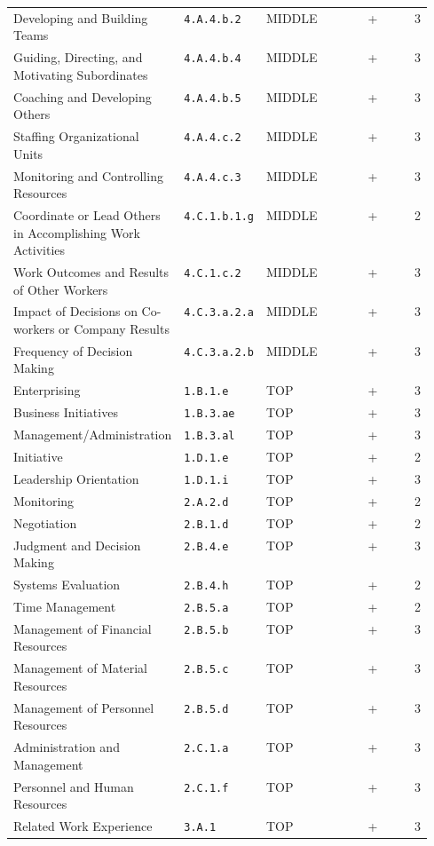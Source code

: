 \begin{longtable}[]{@{}p{0.40\linewidth}p{0.15\linewidth}llr@{}}
Developing and Building Teams & \texttt{4.A.4.b.2} & MIDDLE & + & 3 \\
Guiding, Directing, and Motivating Subordinates & \texttt{4.A.4.b.4} & MIDDLE & + & 3 \\
Coaching and Developing Others & \texttt{4.A.4.b.5} & MIDDLE & + & 3 \\
Staffing Organizational Units & \texttt{4.A.4.c.2} & MIDDLE & + & 3 \\
Monitoring and Controlling Resources & \texttt{4.A.4.c.3} & MIDDLE & + & 3 \\
Coordinate or Lead Others in Accomplishing Work Activities & \texttt{4.C.1.b.1.g} & MIDDLE & + & 2 \\
Work Outcomes and Results of Other Workers & \texttt{4.C.1.c.2} & MIDDLE & + & 3 \\
Impact of Decisions on Co-workers or Company Results & \texttt{4.C.3.a.2.a} & MIDDLE & + & 3 \\
Frequency of Decision Making & \texttt{4.C.3.a.2.b} & MIDDLE & + & 3 \\
Enterprising & \texttt{1.B.1.e} & TOP & + & 3 \\
Business Initiatives & \texttt{1.B.3.ae} & TOP & + & 3 \\
Management/Administration & \texttt{1.B.3.al} & TOP & + & 3 \\
Initiative & \texttt{1.D.1.e} & TOP & + & 2 \\
Leadership Orientation & \texttt{1.D.1.i} & TOP & + & 3 \\
Monitoring & \texttt{2.A.2.d} & TOP & + & 2 \\
Negotiation & \texttt{2.B.1.d} & TOP & + & 2 \\
Judgment and Decision Making & \texttt{2.B.4.e} & TOP & + & 3 \\
Systems Evaluation & \texttt{2.B.4.h} & TOP & + & 2 \\
Time Management & \texttt{2.B.5.a} & TOP & + & 2 \\
Management of Financial Resources & \texttt{2.B.5.b} & TOP & + & 3 \\
Management of Material Resources & \texttt{2.B.5.c} & TOP & + & 3 \\
Management of Personnel Resources & \texttt{2.B.5.d} & TOP & + & 3 \\
Administration and Management & \texttt{2.C.1.a} & TOP & + & 3 \\
Personnel and Human Resources & \texttt{2.C.1.f} & TOP & + & 3 \\
Related Work Experience & \texttt{3.A.1} & TOP & + & 3 \\

\end{longtable}
